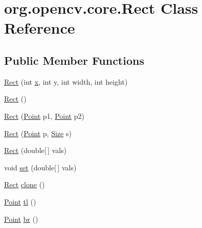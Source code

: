 \hypertarget{classorg_1_1opencv_1_1core_1_1_rect}{}\section{org.\+opencv.\+core.\+Rect Class Reference}
\label{classorg_1_1opencv_1_1core_1_1_rect}
\subsection*{Public Member Functions}
\begin{DoxyCompactItemize}
\item 
\mbox{\hyperlink{classorg_1_1opencv_1_1core_1_1_rect_a9e3dd6cc71d509db5992260f7c81e0eb}{Rect}} (int \mbox{\hyperlink{classorg_1_1opencv_1_1core_1_1_rect_a44cd51a7947e8371834a5e0c53b1c1fc}{x}}, int y, int width, int height)
\item 
\mbox{\hyperlink{classorg_1_1opencv_1_1core_1_1_rect_a62345989905fc3078d9bb985b34e96bd}{Rect}} ()
\item 
\mbox{\hyperlink{classorg_1_1opencv_1_1core_1_1_rect_aee291fca638e6e9bae42fb9a19876afe}{Rect}} (\mbox{\hyperlink{classorg_1_1opencv_1_1core_1_1_point}{Point}} p1, \mbox{\hyperlink{classorg_1_1opencv_1_1core_1_1_point}{Point}} p2)
\item 
\mbox{\hyperlink{classorg_1_1opencv_1_1core_1_1_rect_ab8c8d1ad1221c77c086823d96c15e88f}{Rect}} (\mbox{\hyperlink{classorg_1_1opencv_1_1core_1_1_point}{Point}} p, \mbox{\hyperlink{classorg_1_1opencv_1_1core_1_1_size}{Size}} s)
\item 
\mbox{\hyperlink{classorg_1_1opencv_1_1core_1_1_rect_a54b2b4a7b01049af7b7468d6df942619}{Rect}} (double\mbox{[}$\,$\mbox{]} vals)
\item 
void \mbox{\hyperlink{classorg_1_1opencv_1_1core_1_1_rect_a5da97cb27abd0ad58494faa5d05840a8}{set}} (double\mbox{[}$\,$\mbox{]} vals)
\item 
\mbox{\hyperlink{classorg_1_1opencv_1_1core_1_1_rect}{Rect}} \mbox{\hyperlink{classorg_1_1opencv_1_1core_1_1_rect_adf2c84087a75c926dbacc9ed6b32955d}{clone}} ()
\item 
\mbox{\hyperlink{classorg_1_1opencv_1_1core_1_1_point}{Point}} \mbox{\hyperlink{classorg_1_1opencv_1_1core_1_1_rect_a93ed30c1751ff8a6ba2d6d35c6a138c5}{tl}} ()
\item 
\mbox{\hyperlink{classorg_1_1opencv_1_1core_1_1_point}{Point}} \mbox{\hyperlink{classorg_1_1opencv_1_1core_1_1_rect_a25bdd9080b2dc273d664eb438a9984de}{br}} ()
\item 

\end{DoxyCompactItemize}
